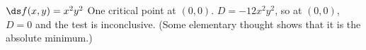 {$\ds f(x,y) = x^2y^2$
}
{
One critical point at $(0,0)$. $D = -12x^2y^2$, so at $(0,0)$, $D = 0$ and the test is inconclusive. (Some elementary thought shows that it is the absolute minimum.)
}